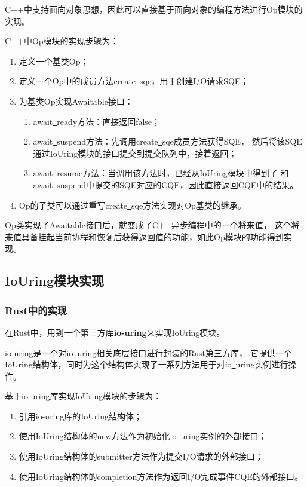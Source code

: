 \documentclass[supercite]{HustGraduPaper}
\theoremstyle{definition}
\begin{document}
C++中支持面向对象思想，因此可以直接基于面向对象的编程方法进行Op模块的实现。\par

C++中Op模块的实现步骤为：

\begin{enumerate}[label={(\arabic*)}]
  \item 定义一个基类Op；
  \item 定义一个Op中的成员方法create\underline{~}sqe，用于创建I/O请求SQE；
  \item 为基类Op实现Awaitable接口：
    \begin{enumerate}
      \item await\underline{~}ready方法：直接返回false；
      \item await\underline{~}suspend方法：先调用create\underline{~}sqe成员方法获得SQE，
        然后将该SQE通过IoUring模块的接口提交到提交队列中，接着返回；
      \item await\underline{~}resume方法：当调用该方法时，已经从IoUring模块中得到了
        和await\underline{~}suspend中提交的SQE对应的CQE，因此直接返回CQE中的结果。
    \end{enumerate}
  \item Op的子类可以通过重写create\underline{~}sqe方法实现对Op基类的继承。
\end{enumerate}

Op类实现了Awaitable接口后，就变成了C++异步编程中的一个将来值，
这个将来值具备挂起当前协程和恢复后获得返回值的功能，如此Op模块的功能得到实现。\par

\subsection{IoUring模块实现}

\subsubsection{Rust中的实现}

在Rust中，用到一个第三方库\textbf{io-uring}来实现IoUring模块。\par

io-uring是一个对io\underline{~}uring相关底层接口进行封装的Rust第三方库，
它提供一个IoUring结构体，同时为这个结构体实现了一系列方法用于对io\underline{~}uring实例进行操作。\par

基于io-uring库实现IoUring模块的步骤为：

\begin{enumerate}[label={(\arabic*)}]
  \item 引用io-uring库的IoUring结构体；
  \item 使用IoUring结构体的new方法作为初始化io\underline{~}uring实例的外部接口；
  \item 使用IoUring结构体的submitter方法作为提交I/O请求的外部接口；
  \item 使用IoUring结构体的completion方法作为返回I/O完成事件CQE的外部接口。
\end{enumerate}
\end{document}
